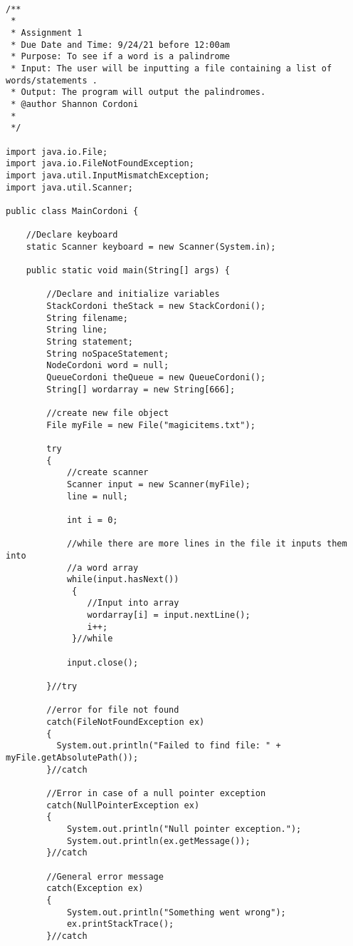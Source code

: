 \documentclass[letterpaper, 10pt,DIV=13]{scrartcl}
\numberwithin{equation}{section} %
\numberwithin{figure}{section} %
\numberwithin{table}{section} %
\begin{document}
\lstset{numbers=left, numberstyle=\tiny, stepnumber=1, numbersep=5pt, basicstyle=\footnotesize\ttfamily}
\begin{lstlisting}[frame=single, ]

/**
 * 
 * Assignment 1 
 * Due Date and Time: 9/24/21 before 12:00am 
 * Purpose: To see if a word is a palindrome 
 * Input: The user will be inputting a file containing a list of words/statements .
 * Output: The program will output the palindromes. 
 * @author Shannon Cordoni 
 * 
 */

import java.io.File;
import java.io.FileNotFoundException;
import java.util.InputMismatchException;
import java.util.Scanner;

public class MainCordoni {

	//Declare keyboard 
	static Scanner keyboard = new Scanner(System.in);
	
	public static void main(String[] args) {

		//Declare and initialize variables 
		StackCordoni theStack = new StackCordoni();
		String filename;
		String line;
		String statement;
		String noSpaceStatement;
		NodeCordoni word = null;
		QueueCordoni theQueue = new QueueCordoni();
		String[] wordarray = new String[666];
			
		//create new file object
		File myFile = new File("magicitems.txt");
		
		try
		{
			//create scanner
			Scanner input = new Scanner(myFile);
			line = null;
			
			int i = 0;

			//while there are more lines in the file it inputs them into 
			//a word array
		    while(input.hasNext())
		     {	
				//Input into array 
				wordarray[i] = input.nextLine();		
				i++;
		     }//while

			input.close();	

		}//try
		
		//error for file not found
		catch(FileNotFoundException ex)
	    {
	      System.out.println("Failed to find file: " + myFile.getAbsolutePath()); 
	    }//catch

		//Error in case of a null pointer exception
	    catch(NullPointerException ex)
	    {
	      	System.out.println("Null pointer exception.");
	      	System.out.println(ex.getMessage());
	    }//catch

		//General error message
	    catch(Exception ex)
	    {
	    	System.out.println("Something went wrong");
	      	ex.printStackTrace();
	    }//catch
		

\end{lstlisting}
\end{document}
